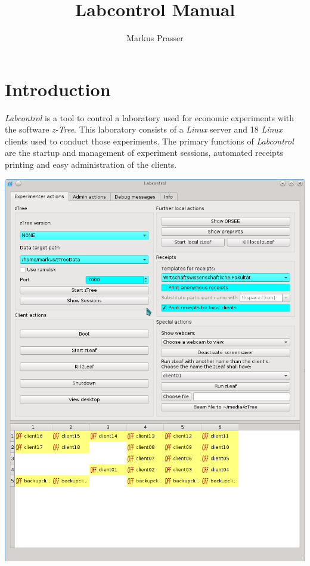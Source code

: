 \documentclass[a4paper,10pt]{article}
\title{Labcontrol Manual}
\author{Markus Prasser}
\begin{document}
\maketitle

\tableofcontents

\newpage

\section{Introduction}

\emph{Labcontrol} is a tool to control a laboratory used for economic experiments with the software \emph{z-Tree}. This laboratory consists of a \emph{Linux} server and 18 \emph{Linux} clients used to conduct those experiments. The primary functions of \emph{Labcontrol} are the startup and management of experiment sessions, automated receipts printing and easy administration of the clients.

\begin{center}
  \includegraphics[scale=.4]{pictures/startup_screen.png}
\end{center}
\end{document}
